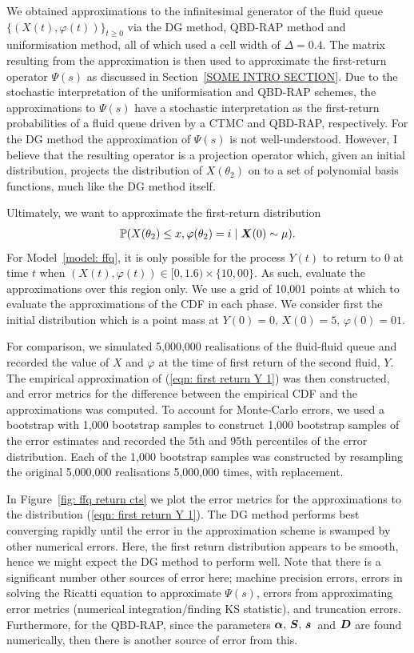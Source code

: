 We obtained approximations to the infinitesimal generator of the fluid queue \(\{(X(t),\varphi(t))\}_{t\geq 0}\) via the DG method, QBD-RAP method and uniformisation method, all of which used a cell width of \(\Delta=0.4\). The matrix resulting from the approximation is then used to approximate the first-return operator \(\Psi(s)\) as discussed in Section~\ref{SOME INTRO SECTION}. Due to the stochastic interpretation of the uniformisation and QBD-RAP schemes, the approximations to \(\Psi(s)\) have a stochastic interpretation as the first-return probabilities of a fluid queue driven by a CTMC and QBD-RAP, respectively. For the DG method the approximation of \(\Psi(s)\) is not well-understood. However, I believe that the resulting operator is a projection operator which, given an initial distribution, projects the distribution of \(X(\theta_2)\) on to a set of polynomial basis functions, much like the DG method itself. 

Ultimately, we want to approximate the first-return distribution 
\begin{align}\label{eqn: first return Y 1}
	\mathbb P(X(\theta_2)\leq x, \varphi(\theta_2)=i\mid \boldsymbol X(0)\sim \mu).
\end{align}
For Model~\ref{model: ffq}, it is only possible for the process \(Y(t)\) to return to \(0\) at time \(t\) when \((X(t),\varphi(t))\in[0,1.6)\times \{10,00\}\). As such, evaluate the approximations over this region only. We use a grid of 10,001 points at which to evaluate the approximations of the CDF in each phase. We consider first the initial distribution which is a point mass at \(Y(0)=0,\, X(0)=5,\, \varphi(0)=01\). 

For comparison, we simulated 5,000,000 realisations of the fluid-fluid queue and recorded the value of \(X\) and \(\varphi\) at the time of first return of the second fluid, \(Y\). The empirical approximation of (\ref{eqn: first return Y 1}) was then constructed, and error metrics for the difference between the empirical CDF and the approximations was computed. To account for Monte-Carlo errors, we used a bootstrap with 1,000 bootstrap samples to construct 1,000 bootstrap samples of the error estimates and recorded the 5th and 95th percentiles of the error distribution. Each of the 1,000 bootstrap samples was constructed by resampling the original 5,000,000 realisations 5,000,000 times, with replacement.

In Figure~\ref{fig: ffq return cts} we plot the error metrics for the approximations to the distribution (\ref{eqn: first return Y 1}). The DG method performs best converging rapidly until the error in the approximation scheme is swamped by other numerical errors. Here, the first return distribution appears to be smooth, hence we might expect the DG method to perform well. Note that there is a significant number other sources of error here; machine precision errors, errors in solving the Ricatti equation to approximate \(\Psi(s)\), errors from approximating error metrics (numerical integration/finding KS statistic), and truncation errors. Furthermore, for the QBD-RAP, since the parameters \(\boldsymbol \alpha,\,\boldsymbol S,\,\boldsymbol s\,\) and \(\boldsymbol D\) are found numerically, then there is another source of error from this. 

